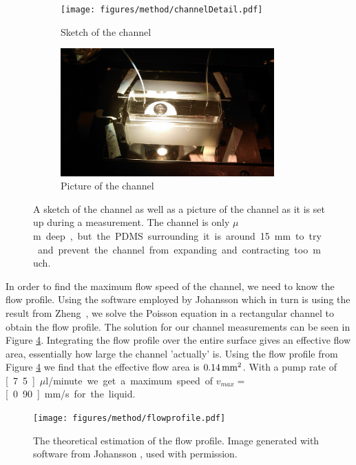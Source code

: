\begin{figure}[H]
\centering
\begin{subfigure}[b]{0.45\textwidth}
\texttt{[image: figures/method/channelDetail.pdf]}
\caption{Sketch of the channel}\label{fig:channelsketch}
\end{subfigure}
\begin{subfigure}[b]{0.45\textwidth}
\includegraphics[width=0.9\textwidth]{figures/method/ChannelZoomed.jpg}
\caption{Picture of the channel}\label{fig:channelpicture}
\end{subfigure}
\caption{A sketch of the channel as well as a picture of the channel as it is set up during a measurement. The channel is only \unit[150]{$\mu$m} deep, but the PDMS surrounding it is around 15 mm to try and prevent the channel from expanding and contracting too much.}
\label{fig:channel}
\end{figure}

In order to find the maximum flow speed of the channel, we need to know the flow profile. Using the software employed by Johansson \cite{AntonThesis} which in turn is using the result from Zheng~\cite{flowprofile}, we solve the Poisson equation in a rectangular channel to obtain the flow profile. The solution for our channel measurements can be seen in Figure \ref{fig:flowprofile}. 
Integrating the flow profile over the entire surface gives an effective flow area, essentially how large the channel 'actually' is. 
Using the flow profile from Figure \ref{fig:flowprofile} we find that the effective flow area is $\unit[0.14]{mm^2}$. With a pump rate of \unit[7.5]{$\mu$l/minute} we get a maximum speed of $v_{max} =$\unit[0.90]{mm/s} for the liquid.



\begin{figure}[H]
\begin{center}
\texttt{[image: figures/method/flowprofile.pdf]}
\end{center}
\caption{The theoretical estimation of the flow profile. Image generated with software from Johansson \cite{AntonThesis}, used with permission.}
\label{fig:flowprofile}
\end{figure}

